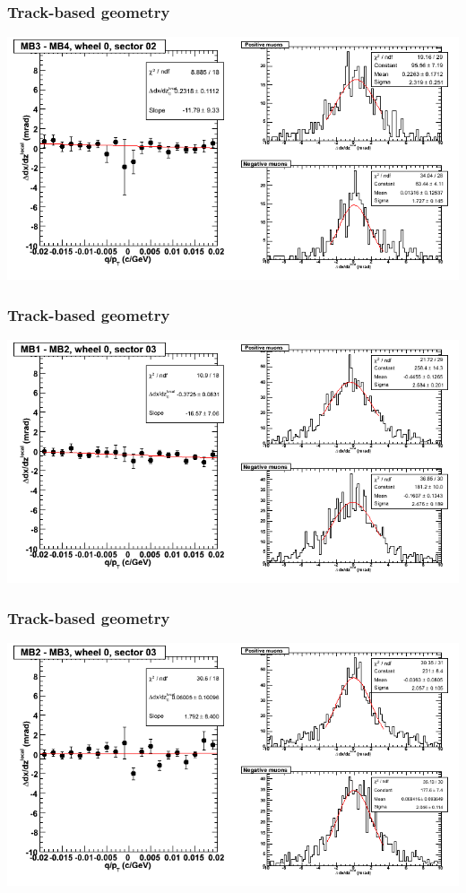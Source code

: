 \documentclass[compress]{beamer}
\begin{document}
\begin{frame}
\frametitle{Track-based geometry}
\includegraphics[width=\linewidth]{NOV4_segdiffs/dt13_slope_C_02_34.png}
\end{frame}

\begin{frame}
\frametitle{Track-based geometry}
\includegraphics[width=\linewidth]{NOV4_segdiffs/dt13_slope_C_03_12.png}
\end{frame}

\begin{frame}
\frametitle{Track-based geometry}
\includegraphics[width=\linewidth]{NOV4_segdiffs/dt13_slope_C_03_23.png}
\end{frame}
\end{document}
